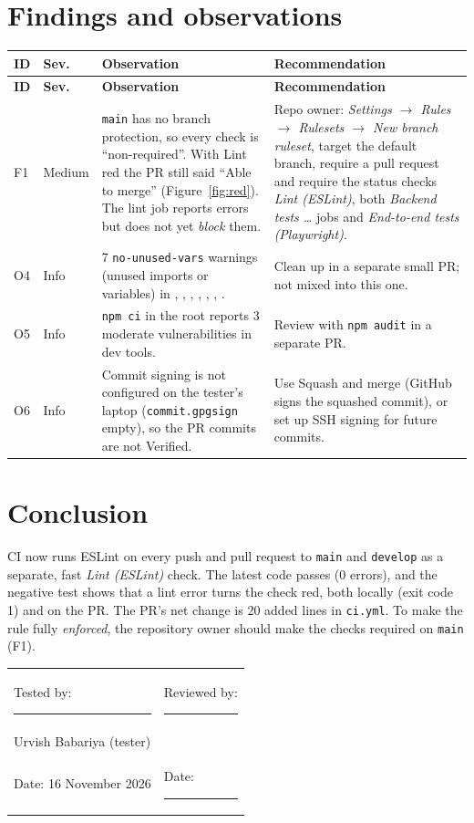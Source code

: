 \documentclass[11pt,a4paper]{article}
\begin{document}
\section{Findings and observations}
{\small{}
\begin{xltabular}{\linewidth}{l l X X}\toprule
\textbf{ID} & \textbf{Sev.} & \textbf{Observation} & \textbf{Recommendation}\\\midrule\endfirsthead
\toprule\textbf{ID} & \textbf{Sev.} & \textbf{Observation} & \textbf{Recommendation}\\\midrule\endhead
F1 & Medium & \texttt{main} has no branch protection, so every check is ``non-required''. With Lint red the PR still said
``Able to merge'' (Figure~\ref{fig:red}). The lint job reports errors but does not yet \emph{block} them. &
Repo owner: \emph{Settings $\rightarrow$ Rules $\rightarrow$ Rulesets $\rightarrow$ New branch ruleset}, target the default branch,
require a pull request and require the status checks \emph{Lint (ESLint)}, both \emph{Backend tests \ldots} jobs and \emph{End-to-end tests (Playwright)}. \\
O4 & Info & 7 \texttt{no-unused-vars} warnings (unused imports or variables) in , , ,
, , , . & Clean up in a separate small PR; not mixed into this one. \\
O5 & Info & \texttt{npm ci} in the root reports 3 moderate vulnerabilities in dev tools. & Review with \texttt{npm audit} in a separate PR. \\
O6 & Info & Commit signing is not configured on the tester's laptop (\texttt{commit.gpgsign} empty), so the PR commits are not Verified. &
Use Squash and merge (GitHub signs the squashed commit), or set up SSH signing for future commits. \\
\bottomrule\end{xltabular}}

\section{Conclusion}
CI now runs ESLint on every push and pull request to \texttt{main} and \texttt{develop} as a separate, fast \emph{Lint (ESLint)} check.
The latest code passes (0 errors), and the negative test shows that a lint error turns the check red, both locally (exit code 1) and on the PR.
The PR's net change is 20 added lines in \texttt{ci.yml}. To make the rule fully \emph{enforced}, the repository owner should make the
checks required on \texttt{main} (F1).

\vspace{1cm}\noindent
\begin{tabularx}{\linewidth}{X X}
Tested by: \rule{5cm}{0.4pt} & Reviewed by: \rule{5cm}{0.4pt}\\[2pt]
Urvish Babariya (tester) & \\[14pt]
Date: 16 November 2026 & Date: \rule{3.5cm}{0.4pt}\\
\end{tabularx}
\end{document}
